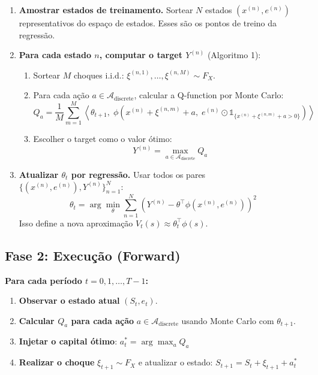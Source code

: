 \documentclass[12pt,a4paper]{article}
\begin{document}
\begin{enumerate}
    \item \textbf{Amostrar estados de treinamento.} Sortear $N$ estados $(x^{(n)}, e^{(n)})$ representativos do espaço de estados. Esses são os pontos de treino da regressão.

    \item \textbf{Para cada estado $n$, computar o target $Y^{(n)}$} (Algoritmo 1):
    \begin{enumerate}
        \item Sortear $M$ choques i.i.d.: $\xi^{(n,1)}, \ldots, \xi^{(n,M)} \sim F_X$.
        \item Para cada ação $a \in \mathcal{A}_{\text{discrete}}$, calcular a Q-function por Monte Carlo:
        \begin{equation}
            Q_a = \frac{1}{M} \sum_{m=1}^{M} \left\langle \theta_{t+1},\; \phi\!\left(x^{(n)} + \xi^{(n,m)} + a,\; e^{(n)} \odot \mathbb{1}_{\{x^{(n)}+\xi^{(n,m)}+a > 0\}}\right) \right\rangle
        \end{equation}
        \item Escolher o target como o valor ótimo:
        \begin{equation}
            Y^{(n)} = \max_{a \in \mathcal{A}_{\text{discrete}}} Q_a
        \end{equation}
    \end{enumerate}

    \item \textbf{Atualizar $\theta_t$ por regressão.} Usar todos os pares $\{(x^{(n)}, e^{(n)}), Y^{(n)}\}_{n=1}^N$:
    \begin{equation}
        \theta_t = \arg\min_{\theta} \sum_{n=1}^{N} \left( Y^{(n)} - \theta^\top \phi(x^{(n)}, e^{(n)}) \right)^2
    \end{equation}
    Isso define a nova aproximação $V_t(s) \approx \theta_t^\top \phi(s)$.
\end{enumerate}

\subsection{Fase 2: Execução (Forward)}

\textbf{Para cada período $t = 0, 1, \ldots, T-1$:}

\begin{enumerate}
    \item \textbf{Observar o estado atual} $(S_t, e_t)$.
    \item \textbf{Calcular $Q_a$ para cada ação} $a \in \mathcal{A}_{\text{discrete}}$ usando Monte Carlo com $\theta_{t+1}$.
    \item \textbf{Injetar o capital ótimo}: $a_t^* = \arg\max_{a} Q_a$
    \item \textbf{Realizar o choque} $\xi_{t+1} \sim F_X$ e atualizar o estado: $S_{t+1} = S_t + \xi_{t+1} + a_t^*$
\end{enumerate}
\end{document}
